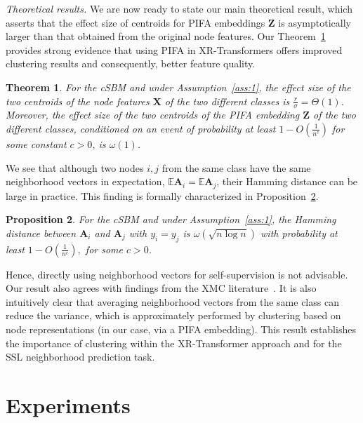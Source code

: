 \documentclass{article} %
\newcommand{\Eli}[1]{{\textcolor{blue}{[Eli: #1]}}}
\newtheorem{theorem}{Theorem}[section]
\newtheorem{proposition}[theorem]{Proposition}
\begin{document}
\textit{Theoretical results. }We are now ready to state our main theoretical result, which asserts that the effect size of centroids for PIFA embeddings $\mathbf{Z}$ is asymptotically larger than that obtained from the original node features. Our Theorem~\ref{thm:main} provides strong evidence that using PIFA in XR-Transformers offers improved clustering results and consequently, better feature quality.
\begin{theorem}\label{thm:main}
	For the cSBM and under Assumption~\ref{ass:1}, the effect size of the two centroids of the node features $\mathbf{X}$ of the two different classes is $\frac{r}{\sigma} = \Theta(1)$. Moreover, the effect size of the two centroids of the PIFA embedding $\mathbf{Z}$ of the two different classes, conditioned on an event of probability at least $1-O(\frac{1}{n^c})$ for some constant $c>0$, is $\omega(1)$.
\end{theorem}
We see that although two nodes $i,j$ from the same class have the same neighborhood vectors in expectation, $\mathbb{E}\mathbf{A}_i = \mathbb{E}\mathbf{A}_j$, their Hamming distance can be large in practice. This finding is formally characterized in Proposition~\ref{prop:Bino}.
\begin{proposition}\label{prop:Bino}
	For the cSBM and under Assumption~\ref{ass:1}, the Hamming distance between $\mathbf{A}_i$ and $\mathbf{A}_j$ with $y_i = y_j$ is $\omega(\sqrt{n\log n})$ with probability at least $1-O(\frac{1}{n^c}),$ for some $c>0$.
\end{proposition}
Hence, directly using neighborhood vectors for self-supervision is not advisable. Our result also agrees with findings from the XMC literature~\citep{chang2020taming}. It is also intuitively clear that averaging neighborhood vectors from the same class can reduce the variance, which is approximately performed by clustering based on node representations (in our case, via a PIFA embedding). This result establishes the importance of clustering within the XR-Transformer approach and for the SSL neighborhood prediction task.

\vspace{-0.3cm}
\section{Experiments}\label{sec:exp}
\end{document}
